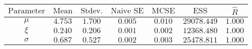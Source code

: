 \begin{tabular}{ccccccc}
\toprule
$\textrm{Parameter}$ & $\textrm{Mean}$ & $\textrm{Stdev.}$ & $\textrm{Naive SE}$ & $\textrm{MCSE}$ & $\textrm{ESS}$ & $\hat{R}$\\
\midrule
$\mu$ & $4.753$ & $1.700$ & $0.005$ & $0.010$ & $29078.449$ & $1.000$\\
$\xi$ & $0.240$ & $0.206$ & $0.001$ & $0.002$ & $12368.480$ & $1.000$\\
$\sigma$ & $0.687$ & $0.527$ & $0.002$ & $0.003$ & $25478.811$ & $1.000$\\
\bottomrule
\end{tabular}
